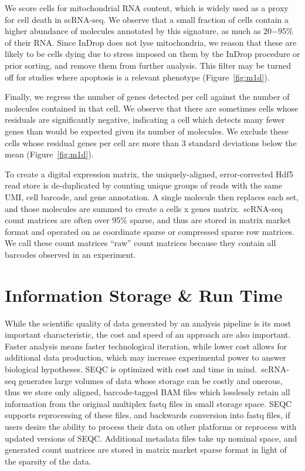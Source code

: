 We score cells for mitochondrial RNA content, which is widely used as a proxy for cell death in scRNA-seq. 
We observe that a small fraction of cells contain a higher abundance of molecules annotated by this signature, as much as 20−95\% of their RNA\@. 
Since InDrop does not lyse mitochondria, we reason that these are likely to be cells dying due to stress imposed on them by the InDrop procedure or prior sorting, and remove them from further analysis. %
This filter may be turned off for studies where apoptosis is a relevant phenotype (Figure~\ref{fig:m1d}).

Finally, we regress the number of genes detected per cell against the number of molecules contained in that cell. 
We observe that there are sometimes cells whose residuals are significantly negative, indicating a cell which detects many fewer genes than would be expected given its number of molecules. 
We exclude these cells whose residual genes per cell are more than 3 standard deviations
below the mean (Figure~\ref{fig:m1d}).

To create a digital expression matrix, the uniquely-aligned, error-corrected Hdf5 read store is de-duplicated by counting unique groups of reads with the same UMI, cell barcode, and gene annotation. 
A single molecule then replaces each set, and those molecules are summed to create a cells x genes matrix.\ 
scRNA-seq count matrices are often over 95\% sparse, and thus are stored in matrix market format and operated on as coordinate sparse or compressed sparse row matrices. 
We call these count matrices ``raw'' count matrices because they contain all barcodes observed in an experiment.

\section{Information Storage \& Run Time}

While the scientific quality of data generated by an analysis pipeline is its most important characteristic, the cost and speed of an approach are also important. 
Faster analysis means faster technological iteration, while lower cost allows for additional data production, which may increase experimental power to answer biological hypotheses. 
SEQC is optimized with cost and time in mind.\ 
scRNA-seq generates large volumes of data whose storage can be costly and onerous, thus we store only aligned, barcode-tagged BAM files which losslessly retain all information from the original multiplex fastq files in small storage space. 
SEQC supports reprocessing of these files, and backwards conversion into fastq files, if users desire the ability to process their data on other platforms or reprocess with updated versions of SEQC\@. 
Additional metadata files take up nominal space, and generated count matrices are stored in matrix market sparse format in light of the sparsity of the data. 

